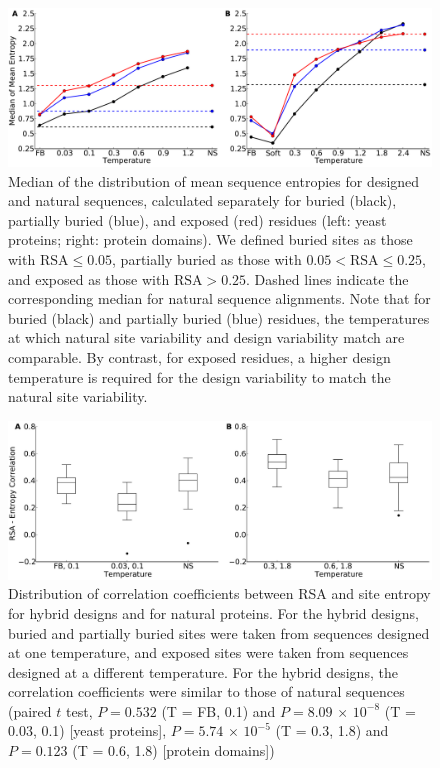 \documentclass[12pt]{article}
\begin{document}
\begin{figure}[H]
\centerline{\includegraphics[width = 6in]{figures/Mean_Entropy_Position_Lineplot_Combo.pdf}}
\caption{Median of the distribution of mean sequence entropies for designed and natural sequences, calculated separately for buried (black), partially buried (blue), and exposed (red) residues (left: yeast proteins; right: protein domains). We defined buried sites as those with $\text{RSA}\leq 0.05$, partially buried as those with $0.05<\text{RSA}\leq0.25$, and exposed as those with $\text{RSA}>0.25$. Dashed lines indicate the corresponding median for natural sequence alignments. Note that for buried (black) and partially buried (blue) residues, the temperatures at which natural site variability and design variability match are comparable. By contrast, for exposed residues, a higher design temperature is required for the design variability to match the natural site variability.}
\label{Mean_Entropy_Surface_Core}
\end{figure}


\begin{figure}[H]
\centerline{\includegraphics[width = 6in]{figures/Combo_Mixed_Temp_Correlation_Plot.pdf}}
\caption{Distribution of correlation coefficients between RSA and site entropy for hybrid designs and for natural proteins. {\color{red}For the hybrid designs, buried and partially buried sites were taken from sequences designed at one temperature, and exposed sites were taken from sequences designed at a different temperature. For the hybrid designs, the correlation coefficients were similar to those of natural sequences (paired $t$ test,  $P=0.532$ (T = FB, 0.1)  and  $P= 8.09 $ $\times$ $10^{-8}$ (T = 0.03, 0.1) [yeast proteins], $P= 5.74$  $\times$ $10^{-5}$ (T = 0.3, 1.8) and $P= 0.123$ (T = 0.6, 1.8)  [protein domains])}}
\label{Mixed_RSA_Entropy}
\end{figure}
\end{document}

